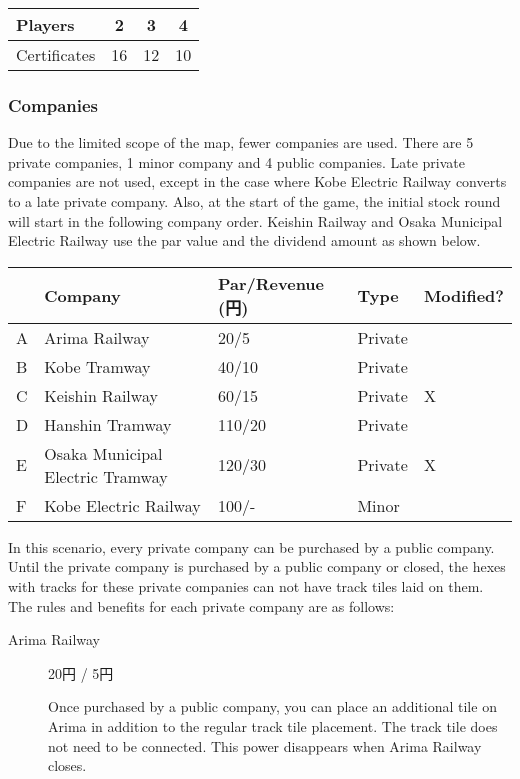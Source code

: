 \begin{multicols}{2}
\begin{tabular}{|l|c|c|c|}
\hline
Players & 2 & 3 & 4 \\
\hline
Certificates & 16 & 12 & 10 \\
\hline
\end{tabular}

\subsubsection{Companies}
Due to the limited scope of the map, fewer companies are used. There
are 5 private companies, 1 minor company and 4 public companies. Late
private companies are not used, except in the case where Kobe Electric
Railway converts to a late private company. Also, at the start of the
game, the initial stock round will start in the following company
order. Keishin Railway and Osaka Municipal Electric Railway use the par
value and the dividend amount as shown below.

\begin{table*}
\begin{tabular}{lllll}
 & Company & Par/Revenue (円) & Type & Modified? \\
\hline
A & Arima Railway & 20/5 & Private & \\
B & Kobe Tramway & 40/10 & Private & \\
C & Keishin Railway & 60/15 & Private & X \\
D & Hanshin Tramway & 110/20 & Private & \\
E & Osaka Municipal Electric Tramway & 120/30 & Private  & X \\
F & Kobe Electric Railway & 100/- & Minor  & \\
\end{tabular}
\end{table*}


In this scenario, every private company can be purchased by a public
company. Until the private company is purchased by a public company or
closed, the hexes with tracks for these private companies can not have
track tiles laid on them. The rules and benefits for each private
company are as follows:

\begin{description}
\item[Arima Railway] 20円 / 5円

  Once purchased by a public company, you can place an additional tile
  on Arima in addition to the regular track tile placement. The track
  tile does not need to be connected. This power disappears when Arima
  Railway closes.


\end{description}
\end{multicols}
